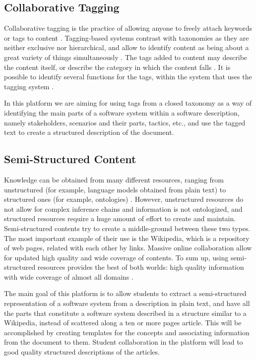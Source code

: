 \documentclass[conference]{IEEEtran}
\begin{document}
\subsection{Collaborative Tagging}
Collaborative tagging is the practice of allowing anyone to freely attach keywords or tags to content \cite{golder2006usage}. Tagging-based systems contrast with taxonomies as they are neither exclusive nor hierarchical, and allow to identify content as being about a great variety of things simultaneously \cite{golder2006usage}. The tags added to content may describe the content itself, or describe the category in which the content falls \cite{coates2005two}. It is possible to identify several functions for the tags, within the system that uses the tagging system \cite{golder2006usage}.

In this platform we are aiming for using tags from a closed taxonomy as a way of identifying the main parts of a software system within a software description, namely stakeholders, scenarios and their parts, tactics, etc., and use the tagged text to create a structured description of the document.

\subsection{Semi-Structured Content}
Knowledge can be obtained from many different resources, ranging from unstructured (for example, language models obtained from plain text) to structured ones (for example, ontologies) \cite{hovy2013collaboratively}. However, unstructured resources do not allow for complex inference chains\cite{domingos2007toward} and information is not ontologized\cite{hovy2013collaboratively}, and structured resources require a huge amount of effort to create and maintain\cite{hovy2013collaboratively}. Semi-structured contents try to create a middle-ground between these two types. The most important example of their use is the Wikipedia, which is a repository of web pages, related with each other by links. Massive online collaboration allow for updated high quality and wide coverage of contents. To sum up, using semi-structured resources provides the best of both worlds: high quality information with wide coverage of almost all domains \cite{hovy2013collaboratively}.
 
The main goal of this platform is to allow students to extract a semi-structured representation of a software system from a description in plain text, and have all the parts that constitute a software system described in a structure similar to a Wikipedia, instead of scattered along a ten or more pages article. This will be accomplished by creating templates for the concepts and associating information from the document to them. Student collaboration in the platform will lead to good quality structured descriptions of the articles.
	
\end{document}
